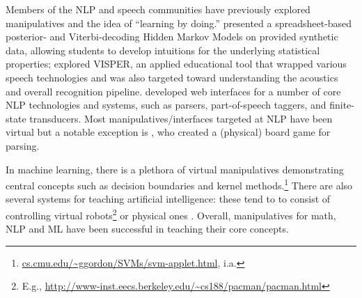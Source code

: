 \documentclass[11pt,letterpaper]{article}
\newcommand{\Note}[1]{}
\renewcommand{\Note}[1]{\hl{[#1]}}  %
\newcommand{\NoteSigned}[3]{{\sethlcolor{#2}\Note{#1: #3}}}
\newcommand{\NoteJE}[1]{\NoteSigned{JE}{LightGreen}{#1}}
\newcommand{\Commented}[1]{#1}
\begin{document}


Members of the NLP and speech communities have previously explored manipulatives and the idea of
``learning by doing.''
 presented a spreadsheet-based posterior- and Viterbi-decoding Hidden Markov Models 
on provided synthetic data, allowing students to develop intuitions for the underlying statistical properties; 
 explored VISPER, an applied educational tool that wrapped various speech technologies and 
was also targeted toward understanding the acoustics and overall recognition pipeline. 
 developed web interfaces for a number of core NLP technologies and systems, such as parsers, part-of-speech 
taggers, and finite-state transducers. 
Most manipulatives/interfaces targeted at NLP have been virtual but a notable exception is , 
who created a (physical) board game for parsing. 

In machine learning, there is a plethora of virtual manipulatives demonstrating central concepts such 
as decision boundaries and kernel methods.\footnote{\url{cs.cmu.edu/~ggordon/SVMs/svm-applet.html}, i.a.} 
There are also several systems for teaching artificial intelligence: these tend to to consist of controlling 
virtual robots\footnote{E.g., \url{http://www-inst.eecs.berkeley.edu/~cs188/pacman/pacman.html}}
or physical ones \cite{tokic2012robot}.
Overall, manipulatives for math, NLP and ML have been successful in teaching their core concepts. 
\end{document}
